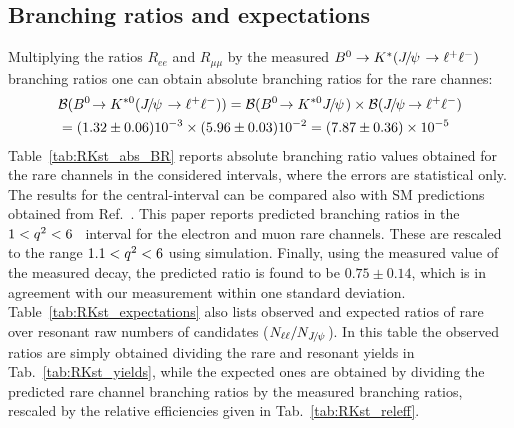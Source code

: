 \subsection{Branching ratios and expectations}

Multiplying the ratios $R_{ee}$ and $R_{\mu\mu}$ by the measured $\Bz\to\Kstar (\jpsi\to\ell^+\ell^-)$~\cite{PDG2014}
branching ratios one can obtain absolute branching ratios for the rare channes:
%
\begin{equation}
\begin{split}
&\BR(\decay{\Bz}{\Kstarz(\jpsi\to\ell^+\ell^-)}) = \BR(\decay{\Bz}{\Kstarz\jpsi}) \times \BR(\decay{\jpsi}{\ll}) \\
& = (1.32 \pm 0.06) 10^{-3} \times (5.96 \pm 0.03) 10^{-2} = (7.87 \pm 0.36) \times 10^{-5}
\end{split}
\end{equation}
%
Table~\ref{tab:RKst_abs_BR} reports absolute branching ratio values obtained for the rare channels
in the considered \qsq intervals, where the errors are statistical only.
%
The results for the central-\qsq interval can be compared also with SM predictions obtained from Ref.~\cite{Ali:2002jg}.
This paper reports predicted branching ratios in the \mbox{$1 < {q^2} < 6$~\gevgevcccc} interval
for the electron and muon rare channels. These are rescaled to the range $1.1 < {q^2} < 6$ \gevgevcccc
using simulation. Finally, using the measured value of the measured \decay{\Bz}{\Kstarz(\jpsi\to\ell^+\ell^-)}
decay, the predicted ratio is found to be $0.75 \pm 0.14$,
which is in agreement with our measurement within one standard deviation.
Table~\ref{tab:RKst_expectations} also lists observed and expected ratios of rare
over resonant raw numbers of candidates ($N_{\ell\ell} / N_{\jpsi}$). In this table the observed ratios
are simply obtained dividing the rare and resonant yields in Tab.~\ref{tab:RKst_yields}, while
the expected ones are obtained by dividing the predicted rare channel branching ratios by 
the measured \decay{\Bz}{\Kstar(\jpsi\to\ll)} branching ratios, rescaled by the
relative efficiencies given in Tab.~\ref{tab:RKst_releff}.  

